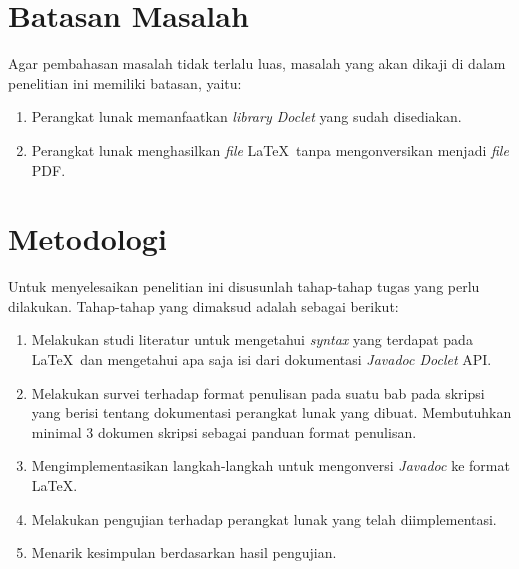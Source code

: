 \section{Batasan Masalah}
\label{sec:batasan}
Agar pembahasan masalah tidak terlalu luas, masalah yang akan dikaji di dalam penelitian ini memiliki batasan, yaitu:
\begin{enumerate}
	\item Perangkat lunak memanfaatkan {\it library Doclet} yang sudah disediakan.
	\item Perangkat lunak menghasilkan {\it file} \LaTeX\ tanpa mengonversikan menjadi {\it file} PDF. 
\end{enumerate}

\section{Metodologi}
\label{sec:metlit}
Untuk menyelesaikan penelitian ini disusunlah tahap-tahap tugas yang perlu dilakukan. Tahap-tahap yang dimaksud adalah sebagai berikut:
\begin{enumerate}
	\item Melakukan studi literatur untuk mengetahui {\it syntax} yang terdapat pada \LaTeX\ dan mengetahui apa saja isi dari dokumentasi {\it Javadoc Doclet} API.
	\item Melakukan survei terhadap format penulisan pada suatu bab pada skripsi yang berisi tentang dokumentasi perangkat lunak yang dibuat. Membutuhkan minimal 3 dokumen skripsi sebagai panduan format penulisan.
	\item Mengimplementasikan langkah-langkah untuk mengonversi {\it Javadoc} ke format \LaTeX.
	\item Melakukan pengujian terhadap perangkat lunak yang telah diimplementasi.
	\item Menarik kesimpulan berdasarkan hasil pengujian.
\end{enumerate}


